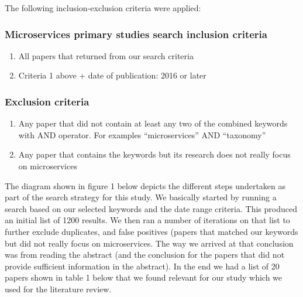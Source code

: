 \documentclass{article}
\begin{document}
The following inclusion-exclusion criteria were applied:

\subsubsection{Microservices primary studies search inclusion criteria}

\begin{enumerate} 


\item All papers that returned from our search criteria
\item Criteria 1 above + date of publication: 2016 or later
\end{enumerate}

\subsubsection{Exclusion criteria}


\begin{enumerate}


\item Any paper that did not contain at least any two of the combined keywords with AND operator. For examples “microservices” AND “taxonomy”
\item Any paper that contains the keywords but its research does not really focus on microservices 
\end{enumerate} 

The diagram shown in figure 1 below depicts the different steps undertaken as part of the search strategy for this study. We basically started by running a search based on our selected keywords and the date range criteria. This produced an initial list of 1200 results. We then ran a number of iterations on that list to further exclude duplicates, and false positives (papers that matched our keywords but did not really focus on microservices. The way we arrived at that conclusion was from reading the abstract (and the conclusion for the papers that did not provide sufficient information in the abstract). In the end we had a list of 20 papers shown in table 1 below that we found relevant for our study which we used for the literature review.
\end{document}
